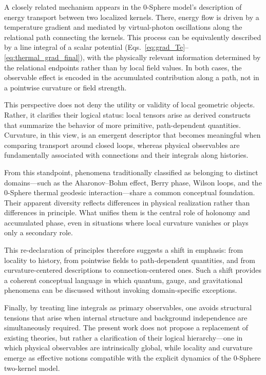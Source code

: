 \documentclass[%
 reprint,
 amsmath,amssymb,
 aps,
 prb,
]{revtex4-2}
\numberwithin{equation}{section}
\begin{document}
A closely related mechanism appears in the 0-Sphere model’s description of energy transport between two localized kernels. There, energy flow is driven by a temperature gradient and mediated by virtual-photon oscillations along the relational path connecting the kernels. This process can be equivalently described by a line integral of a scalar potential (Eqs.~\eqref{eq:grad_Te}–\eqref{eq:thermal_grad_final}), with the physically relevant information determined by the relational endpoints rather than by local field values. In both cases, the observable effect is encoded in the accumulated contribution along a path, not in a pointwise curvature or field strength.

This perspective does not deny the utility or validity of local geometric objects. Rather, it clarifies their logical status: local tensors arise as derived constructs that summarize the behavior of more primitive, path-dependent quantities. Curvature, in this view, is an emergent descriptor that becomes meaningful when comparing transport around closed loops, whereas physical observables are fundamentally associated with connections and their integrals along histories.

From this standpoint, phenomena traditionally classified as belonging to distinct domains—such as the Aharonov--Bohm effect, Berry phase, Wilson loops, and the 0-Sphere thermal geodesic interaction—share a common conceptual foundation. Their apparent diversity reflects differences in physical realization rather than differences in principle. What unifies them is the central role of holonomy and accumulated phase, even in situations where local curvature vanishes or plays only a secondary role.

This re-declaration of principles therefore suggests a shift in emphasis: from locality to history, from pointwise fields to path-dependent quantities, and from curvature-centered descriptions to connection-centered ones. Such a shift provides a coherent conceptual language in which quantum, gauge, and gravitational phenomena can be discussed without invoking domain-specific exceptions.

Finally, by treating line integrals as primary observables, one avoids structural tensions that arise when internal structure and background independence are simultaneously required. The present work does not propose a replacement of existing theories, but rather a clarification of their logical hierarchy—one in which physical observables are intrinsically global, while locality and curvature emerge as effective notions compatible with the explicit dynamics of the 0-Sphere two-kernel model.
\end{document}
